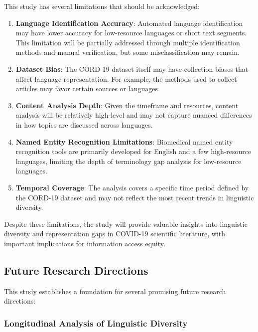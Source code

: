 \documentclass[
]{article}
\begin{document}
This study has several limitations that should be acknowledged:

\begin{enumerate}
\def\labelenumi{\arabic{enumi}.}
\item
  \textbf{Language Identification Accuracy}: Automated language
  identification may have lower accuracy for low-resource languages or
  short text segments. This limitation will be partially addressed
  through multiple identification methods and manual verification, but
  some misclassification may remain.
\item
  \textbf{Dataset Bias}: The CORD-19 dataset itself may have collection
  biases that affect language representation. For example, the methods
  used to collect articles may favor certain sources or languages.
\item
  \textbf{Content Analysis Depth}: Given the timeframe and resources,
  content analysis will be relatively high-level and may not capture
  nuanced differences in how topics are discussed across languages.
\item
  \textbf{Named Entity Recognition Limitations}: Biomedical named entity
  recognition tools are primarily developed for English and a few
  high-resource languages, limiting the depth of terminology gap
  analysis for low-resource languages.
\item
  \textbf{Temporal Coverage}: The analysis covers a specific time period
  defined by the CORD-19 dataset and may not reflect the most recent
  trends in linguistic diversity.
\end{enumerate}

Despite these limitations, the study will provide valuable insights into
linguistic diversity and representation gaps in COVID-19 scientific
literature, with important implications for information access equity.

\subsection{Future Research
Directions}\label{future-research-directions}

This study establishes a foundation for several promising future
research directions:

\subsubsection{Longitudinal Analysis of Linguistic
Diversity}\label{longitudinal-analysis-of-linguistic-diversity}
\end{document}
